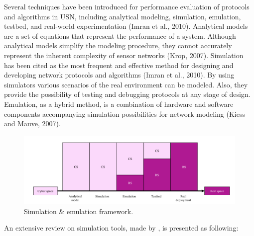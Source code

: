 Several techniques have been introduced for performance evaluation of protocols and algorithms in USN, including analytical modeling,
simulation, emulation, testbed, and real-world experimentation (Imran
et al., 2010). Analytical models are a set of equations that represent the
performance of a system. Although analytical models simplify the
modeling procedure, they cannot accurately represent the inherent
complexity of sensor networks (Krop, 2007). Simulation has been cited
as the most frequent and effective method for designing and developing
network protocols and algorithms (Imran et al., 2010). By using
simulators various scenarios of the real environment can be modeled.
Also, they provide the possibility of testing and debugging protocols at
any stage of design. Emulation, as a hybrid method, is a combination of
hardware and software components accompanying simulation possibilities for network modeling (Kiess and Mauve, 2007). 

\begin{figure}[h!]
	\centering
	\includegraphics[width=1\textwidth,keepaspectratio]{figures/simul_VS_emul}
	\caption{Simulation \& emulation framework.}
	
\end{figure}

An extensive review on simulation tools, made by \cite{nayyar2015}, is presented as following:

